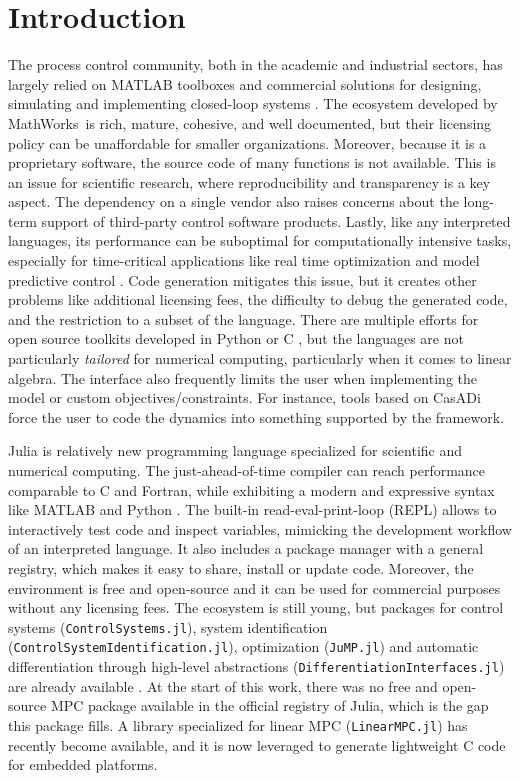 \section{Introduction}

The process control community, both in the academic and industrial sectors, has largely relied on MATLAB toolboxes and commercial solutions for designing, simulating and implementing closed-loop systems \citep{optimMatlab}. The ecosystem developed by MathWorks\texttrademark\ is rich, mature, cohesive, and well documented, but their licensing policy can be unaffordable for smaller organizations. Moreover, because it is a proprietary software, the source code of many functions is not available. This is an issue for scientific research, where reproducibility and transparency is a key aspect. The dependency on a single vendor also raises concerns about the long-term support of third-party control software products. Lastly, like any interpreted languages, its performance can be suboptimal for computationally intensive tasks, especially for time-critical applications like real time optimization and model predictive control \citep{matlabPythonJulia, juliaML}. Code generation mitigates this issue, but it creates other problems like additional licensing fees, the difficulty to debug the generated code, and the restriction to a subset of the language. There are multiple efforts for open source toolkits developed in Python or C \citep{doMPC, gekko, acados}, but the languages are not particularly \emph{tailored} for numerical computing, particularly when it comes to linear algebra. The interface also frequently limits the user when implementing the model or custom objectives/constraints. For instance, tools based on CasADi \citep{casadi} force the user to code the dynamics into something supported by the framework.

Julia is relatively new programming language specialized for scientific and numerical computing. The just-ahead-of-time compiler can reach performance comparable to C and Fortran, while exhibiting a modern and expressive syntax like MATLAB and Python \citep{juliaPaper}. The built-in read-eval-print-loop (REPL) allows to interactively test code and inspect variables, mimicking the development workflow of an interpreted language. It also includes a package manager with a general registry, which makes it easy to share, install or update code. Moreover, the environment is free and open-source and it can be used for commercial purposes without any licensing fees. The ecosystem is still young, but packages for control systems (\texttt{ControlSystems.jl}), system identification (\texttt{ControlSystemIdentification.jl}), optimization (\texttt{JuMP.jl}) and automatic differentiation through high-level abstractions (\texttt{DifferentiationInterfaces.jl}) are already available \citep{controlsystems, jump, differentiationinterface}. At the start of this work, there was no free and open-source MPC package available in the official registry of Julia, which is the gap this package fills. A library specialized for linear MPC (\texttt{LinearMPC.jl}) has recently become available, and it is now leveraged to generate lightweight C code for embedded platforms.

